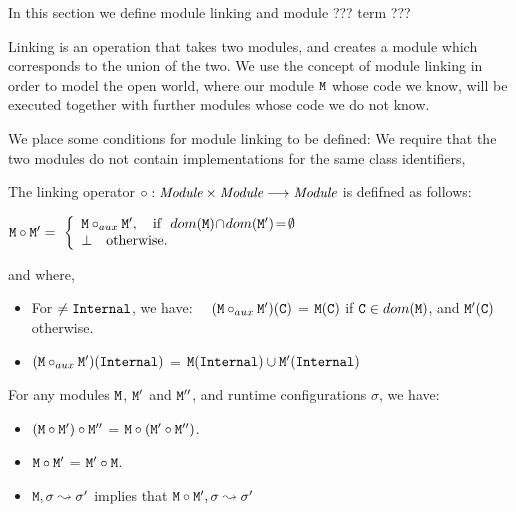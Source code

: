  In this section we define  module linking and module ??? term ???
 
 Linking is an operation that takes two modules, and creates a module which corresponds  to the union of the two. We use the concept of module linking in order to model the open world, where our module ${\mbox{\tt{M}}}$ whose code we know, will be executed together with further modules whose code we do not know. 

We place some conditions for module linking to be defined: We require that the two modules do not contain implementations for the same class identifiers,  

\begin{definition}

The linking operator $\circ : {\mbox{\tt{{\it Module}}}} \times  {\mbox{\tt{{\it Module}}}} \longrightarrow {\mbox{\tt{{\it Module}}}}$ is defifned as follows:

$
\M \circ \M{'}  =\ \left\{
\begin{array}{l}
                        \M \circ_{aux} \M{'},\ \ \   \hbox{if}\  \ dom(\M)\!\cap\!dom(\M')\!=\!\emptyset\\
\bot  \ \ \ \mbox{otherwise.}
\end{array}
                    \right.$
                    
and where,                  
\begin{itemize}
     \item 
   For $\neq{\mbox{\tt{Internal}}}$, we have: \ \
   $({\mbox{\tt{M}}} \circ_{aux} {\mbox{\tt{M}}}')({\mbox{\tt{C}}})$ = ${\mbox{\tt{M}}}({\mbox{\tt{C}}})$  if  ${\mbox{\tt{C}}}\in dom({\mbox{\tt{M}}})$, and  ${\mbox{\tt{M}}}'({\mbox{\tt{C}}})$ otherwise.
    \item  
   $({\mbox{\tt{M}}} \circ_{aux} {\mbox{\tt{M}}}')({\mbox{\tt{Internal}}})$ = $ {\mbox{\tt{M}}}({\mbox{\tt{Internal}}}) \cup  {\mbox{\tt{M}}}'({\mbox{\tt{Internal}}})$
 \end{itemize}
\end{definition}

 
 \begin{lemma}
 For any modules ${\mbox{\tt{M}}}$,   ${\mbox{\tt{M}}}'$ and ${\mbox{\tt{M}}}''$, and runtime configurations $\sigma$, we have$:$
 \label{lemma:linking:properties}
 
 \begin{itemize}
     \item 
     $({\mbox{\tt{M}}} \circ {\mbox{\tt{M}}}')\circ {\mbox{\tt{M}}}''$ = ${\mbox{\tt{M}}} \circ ({\mbox{\tt{M}}}' \circ {\mbox{\tt{M}}}'')$.
    \item  
      ${\mbox{\tt{M}}} \circ {\mbox{\tt{M}}}'$  = ${\mbox{\tt{M}}}' \circ{\mbox{\tt{M}}}$.
      \item
      ${\mbox{\tt{M}}}, \sigma \leadsto \sigma'$  implies that  ${\mbox{\tt{M}}}\circ {\mbox{\tt{M}}}', \sigma \leadsto \sigma'$
   \end{itemize}
 
 \end{lemma}
 
